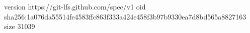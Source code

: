 version https://git-lfs.github.com/spec/v1
oid sha256:1a076da55514fe4583ffc863f333a424e458f3b97b9330ea7d8bd565a8827163
size 31039
